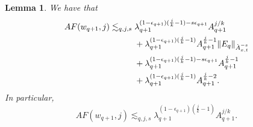 \documentclass[12pt,reqno,letterpaper]{amsart}
\numberwithin{equation}{section}
\newcommand{\1}{{\bf 1}}
\newcommand{\2}{{\bf 2}}
\newcommand{\A}{\mathbb A}
\newtheorem{lemma}[theorem]{Lemma}
\theoremstyle{remark}
\theoremstyle{remark}
\begin{document}
\begin{lemma}\label{lem:horrible1}
    We have that
    \[
\begin{aligned}
AF(w_{q+1},j)
\lesssim_{q,j,s}\;&
\lambda_{q+1}^{(1-\epsilon_{q+1})(\frac jk-1)-s\epsilon_{q+1}}
A_{q+1}^{j/k}
\\
&+
\lambda_{q+1}^{(1-\epsilon_{q+1})(\frac jk-1)}
A_{q+1}^{\frac jk-1}
\|E_q\|_{\dot{\mathbb \A}^{-s}_{x, t}}
\\
&+
\lambda_{q+1}^{(1-\epsilon_{q+1})(\frac jk-1)-s\epsilon_{q+1}}
A_{q+1}^{\frac jk-1}
\\
&+
\lambda_{q+1}^{(1-\epsilon_{q+1})(\frac jk-1)}
A_{q+1}^{\frac jk-2}.
\end{aligned}
\]
In particular,
\[
AF(w_{q+1},j)
\lesssim_{q,j,s}
\lambda_{q+1}^{(1-\epsilon_{q+1})(\frac jk-1)}
A_{q+1}^{j/k}.
\]

\end{lemma}
\end{document}
